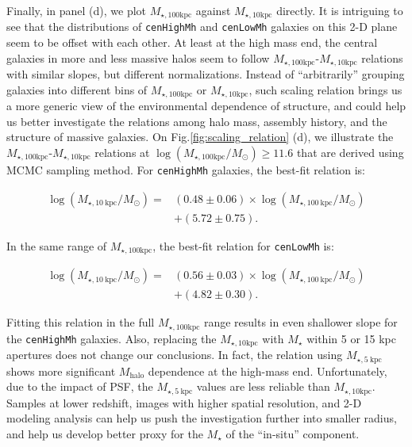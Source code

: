 \documentclass{emulateapj}
\def\rbcg{\texttt{cenHighMh}}
\def\nbcg{\texttt{cenLowMh}}
\def\mstar{{$M_{\star}$}}
\def\mhalo{{$M_{\mathrm{halo}}$}}
\def\minn{{$M_{\star,10\mathrm{kpc}}$}}
\def\mtot{{$M_{\star,100\mathrm{kpc}}$}}
\def\logmtot{{$\log (M_{\star,100\mathrm{kpc}}/M_{\odot})$}}
\newcommand{\update}[1]{\textcolor{Bittersweet}{#1}}
\begin{document}
\begin{CJK*}{UTF8}{gbsn}
    Finally, in panel (d), we plot \mtot{} against \minn{} directly.  
    It is intriguing to see that the distributions of \rbcg{} and \nbcg{} galaxies 
    on this 2-D plane seem to be offset with each other. 
    At least at the high mass end, the central galaxies in more and less massive 
    halos seem to follow \mtot{}-\minn{} relations with similar slopes, but different 
    normalizations.  
    Instead of ``arbitrarily'' grouping galaxies into different bins of \mtot{} or 
    \minn{}, such scaling relation brings us a more generic view of the environmental 
    dependence of structure, and could help us better investigate the relations among 
    halo mass, assembly history, and the structure of massive galaxies.
    On Fig.\ref{fig:scaling_relation} (d), we illustrate the \mtot{}-\minn{} relations 
    at \logmtot$\geq 11.6$ that are derived using MCMC sampling method.  
    For \rbcg{} galaxies, the best-fit relation is:
    
    \begin{equation}
        \begin{aligned}
        \log (M_{\star, 10\ \mathrm{kpc}}/M_{\odot}) = & (0.48\pm0.06) \times \log (M_{\star, 100\ \mathrm{kpc}}/M_{\odot}) \\ & +(5.72\pm0.75).
        \end{aligned}
    \end{equation}
    
    \noindent In the same range of \mtot{}, the best-fit relation for \nbcg{} is:
     
    \begin{equation}
        \begin{aligned}
        \log (M_{\star, 10\ \mathrm{kpc}}/M_{\odot}) = & (0.56\pm0.03) \times \log (M_{\star, 100\ \mathrm{kpc}}/M_{\odot}) \\ & +(4.82\pm0.30).
        \end{aligned}
    \end{equation}
     
    Fitting this relation in the full \mtot{} range results in even shallower slope for 
    the \rbcg{} galaxies. 
    Also, replacing the \minn{} with \mstar{} within 5 or 15 kpc apertures does not 
    change our conclusions. 
    In fact, the relation using $M_{\star, 5\ \mathrm{kpc}}$ shows more significant 
    \mhalo{} dependence at the high-mass end. 
    Unfortunately, due to the impact of PSF, the $M_{\star, 5\ \mathrm{kpc}}$ values 
    are less reliable than \minn{}. 
    \update{
    Samples at lower redshift, images with higher spatial resolution, and 2-D modeling 
    analysis can help us push the investigation further into smaller radius, and help 
    us develop better proxy for the \mstar{} of the ``in-situ'' component.  
    }
    

\end{CJK*}
\end{document}
